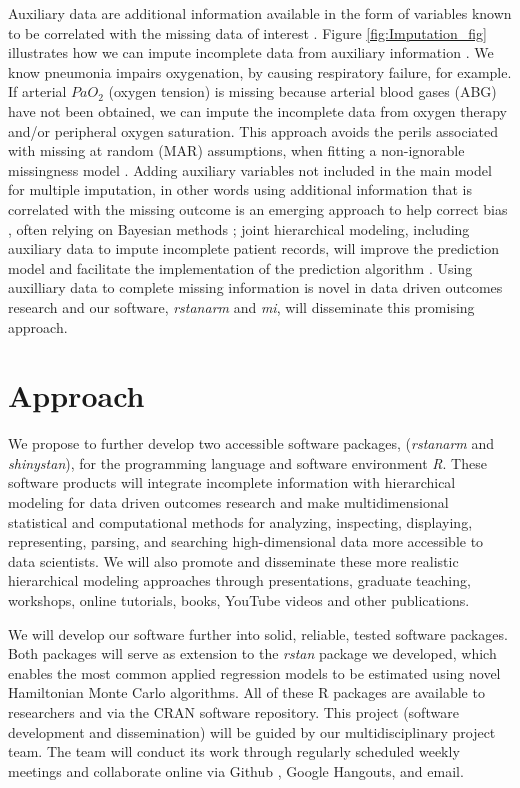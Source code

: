 \documentclass[11pt,notitlepage]{article}
\begin{document}
Auxiliary data are additional information available in the form of variables known 
to be correlated with the missing data of interest 
\cite{Hall_25389642,Daniels24571539}. Figure \ref{fig:Imputation_fig} 
illustrates how we can impute incomplete data from auxiliary information 
\cite{Ibrahim2001auxilliaryImputaton,Schomaker23873614}. We know pneumonia 
impairs oxygenation, by causing respiratory failure, for example. If 
arterial $PaO_2$ (oxygen tension) is missing because arterial blood 
gases (ABG) have not been obtained, we can impute the incomplete data 
from oxygen therapy and/or peripheral oxygen saturation\cite{Hall_25389642}. 
This approach avoids the perils associated with missing at random (MAR) 
assumptions, when fitting a non-ignorable missingness model \cite{Wang_20029935}. 
Adding auxiliary variables not included in the main model for multiple imputation, 
in other words using additional information that is correlated with the missing 
outcome is an emerging approach to help correct bias 
\cite{Meng1994, Collins_11778676, Rubin1996}, often relying on 
Bayesian methods \cite{Daniels2008, Schafer1997}; joint hierarchical 
modeling, including auxiliary data to impute incomplete patient records, 
will improve the prediction model and facilitate the implementation of the 
prediction algorithm \cite{Hall_25389642}. Using auxilliary data to complete 
missing information is novel in data driven outcomes research and our 
software, \textit{rstanarm} and \textit{mi}, will disseminate this promising approach. 

\section*{Approach}

We propose to further develop two accessible software packages, (\textit{rstanarm} 
and \textit{shinystan}), for the programming language and software environment 
\textit{R}. These software products will integrate incomplete information 
with hierarchical modeling for data driven outcomes research and make 
multidimensional statistical and computational methods for 
analyzing, inspecting, displaying, representing, parsing, and 
searching high-dimensional data more accessible to 
data scientists. We will also promote and disseminate these more realistic 
hierarchical modeling approaches through presentations, graduate teaching, 
workshops, online tutorials, books, YouTube videos and other publications.

We will develop our software further into solid, reliable, tested software packages. 
Both packages will serve as extension to the \textit{rstan} package we developed, 
which enables the most common applied regression models to be estimated using 
novel Hamiltonian Monte Carlo algorithms. All of these R packages are available to 
researchers and via the CRAN software repository. This project (software development and dissemination) will be guided by 
our multidisciplinary project team. The team will conduct its work through 
regularly scheduled weekly meetings and collaborate online via 
Github \cite{Chacon2009ProGit}, Google Hangouts, and email. 
\end{document}
